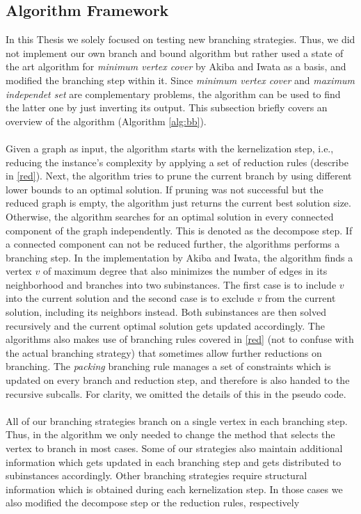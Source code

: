 \documentclass[]{article}
\begin{document}
\subsection{Algorithm Framework}

In this Thesis we solely focused on testing new branching strategies. Thus, we did not implement our own branch and bound algorithm but rather used a state of the art algorithm for \textit{minimum vertex cover} by Akiba and Iwata \cite{akiba_iwata} as a basis, and modified the branching step within it. Since \textit{minimum vertex cover} and \textit{maximum independet set} are complementary problems, the algorithm can be used to find the latter one by just inverting its output. This subsection briefly covers an overview of the algorithm (Algorithm \ref{alg:bb}).\\\\
Given a graph as input, the algorithm starts with the kernelization step, i.e., reducing the instance's complexity by applying a set of reduction rules (describe in \ref{red}). Next, the algorithm tries to prune the current branch by using different lower bounds to an optimal solution. If pruning was not successful but the reduced graph is empty, the algorithm just returns the current best solution size. Otherwise, the algorithm searches for an optimal solution in every connected component of the graph independently. This is denoted as the decompose step. If a connected component can not be reduced further, the algorithms performs a branching step. In the implementation by Akiba and Iwata, the algorithm finds a vertex $v$ of maximum degree that also minimizes the number of edges in its neighborhood and branches into two subinstances. The first case is to include $v$ into the current solution and the second case is to exclude $v$ from the current solution, including its neighbors instead. Both subinstances are then solved recursively and the current optimal solution gets updated accordingly. The algorithms also makes use of branching rules covered in \ref{red} (not to confuse with the actual branching strategy) that sometimes allow further reductions on branching. The \textit{packing} branching rule manages a set of constraints which is updated on every branch and reduction step, and therefore is also handed to the recursive subcalls. For clarity, we omitted the details of this in the pseudo code. \\\\  
All of our branching strategies branch on a single vertex in each branching step. Thus, in the algorithm we only needed to change the method that selects the vertex to branch in most cases. Some of our strategies also maintain additional information which gets updated in each branching step and gets distributed to subinstances accordingly. Other branching strategies require structural information which is obtained during each kernelization step. In those cases we also modified the decompose step or the reduction rules, respectively \\\\
\end{document}
